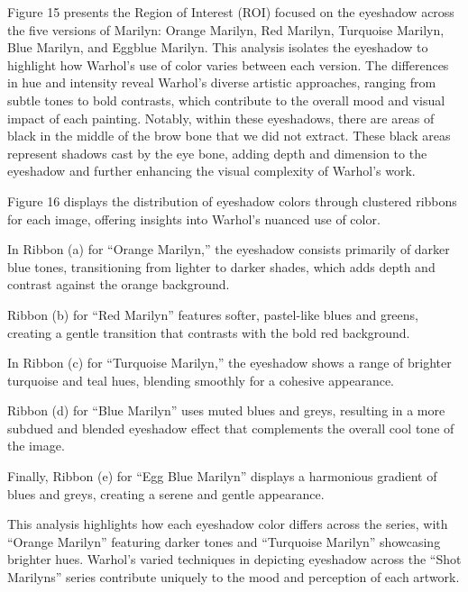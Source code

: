 \documentclass{article}
\begin{document}
Figure 15 presents the Region of Interest (ROI) focused on the eyeshadow
across the five versions of Marilyn: Orange Marilyn, Red Marilyn,
Turquoise Marilyn, Blue Marilyn, and Eggblue Marilyn. This analysis
isolates the eyeshadow to highlight how Warhol's use of color varies
between each version. The differences in hue and intensity reveal
Warhol's diverse artistic approaches, ranging from subtle tones to bold
contrasts, which contribute to the overall mood and visual impact of
each painting. Notably, within these eyeshadows, there are areas of
black in the middle of the brow bone that we did not extract. These
black areas represent shadows cast by the eye bone, adding depth and
dimension to the eyeshadow and further enhancing the visual complexity
of Warhol's work.

Figure 16 displays the distribution of eyeshadow colors through
clustered ribbons for each image, offering insights into Warhol's
nuanced use of color.

In Ribbon (a) for ``Orange Marilyn,'' the eyeshadow consists primarily
of darker blue tones, transitioning from lighter to darker shades, which
adds depth and contrast against the orange background.

Ribbon (b) for ``Red Marilyn'' features softer, pastel-like blues and
greens, creating a gentle transition that contrasts with the bold red
background.

In Ribbon (c) for ``Turquoise Marilyn,'' the eyeshadow shows a range of
brighter turquoise and teal hues, blending smoothly for a cohesive
appearance.

Ribbon (d) for ``Blue Marilyn'' uses muted blues and greys, resulting in
a more subdued and blended eyeshadow effect that complements the overall
cool tone of the image.

Finally, Ribbon (e) for ``Egg Blue Marilyn'' displays a harmonious
gradient of blues and greys, creating a serene and gentle appearance.

This analysis highlights how each eyeshadow color differs across the
series, with ``Orange Marilyn'' featuring darker tones and ``Turquoise
Marilyn'' showcasing brighter hues. Warhol's varied techniques in
depicting eyeshadow across the ``Shot Marilyns'' series contribute
uniquely to the mood and perception of each artwork.
\end{document}

